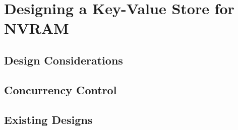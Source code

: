 \chapter{Designing a Key-Value Store for NVRAM}
\label{ch:dse}

\section{Design Considerations}
\section{Concurrency Control}
\section{Existing Designs}

